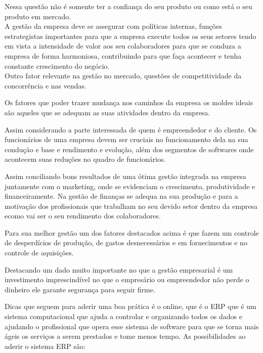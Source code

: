 \documentclass[article, a4paper, 12pt, brazil]{abntex2}
\begin{document}
    \par Nessa questão não é somente ter a confiança do seu produto ou como está o seu produto em mercado.\\
   A gestão da empresa deve se assegurar com políticas internas, funções estrategistas importantes para que a empresa execute todos os seus setores tendo em vista a intensidade de valor aos seu colaboradores para que se conduza a empresa de forma harmoniosa,  contribuindo para que faça acontecer e tenha constante crescimento do negócio.\\
   Outro fator relevante na gestão no mercado, questões de competitividade da concorrência e nas vendas.\\
   \par Os fatores que poder trazer mudança nos caminhos da empresa os moldes ideais são aqueles que se adequam as suas atividades dentro da empresa.\\
   \par Assim considerando a parte interessada de quem é empreendedor e do cliente.
   Os funcionários de uma empresa devem ser cruciais no funcionamento dela na sua condução e base e rendimento e evolução, além dos segmentos de softwares onde acontecem suas reduções no quadro de funcionários.\\
   \par Assim conciliando bons resultados de uma ótima gestão integrada na empresa juntamente com o marketing,  onde se evidenciam o crescimento, produtividade e financeiramente.
   Na gestão de finanças se adequa na sua produção e para a motivação dos profissionais que trabalham no seu devido setor dentro da empresa ecomo vai ser o seu rendimento dos colaboradores.\\
   \par Para sua melhor gestão um dos fatores destacados acima é que fazem um controle de desperdícios de produção,  de gastos desnecessários e  em fornecimentos e  no controle de aquisições.\\
   \par Destacando um dado muito importante no que a gestão empresarial é um investimento imprescindível no que o empresário ou empreendedor não perde o dinheiro ele garante segurança para seguir firme.\\
   \par Dicas que seguem para aderir uma boa prática é o online, que é o ERP que é um sistema computacional que ajuda a controlar e organizando todos os dados e ajudando o profissional que opera esse sistema de software para que se torna mais ágeis os serviços a serem prestados e tome menos tempo.
   As possibilidades ao aderir o sistema ERP são:\\
\end{document}

